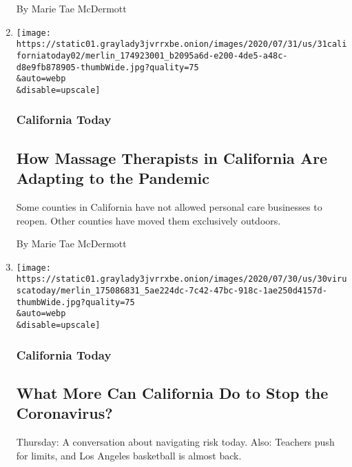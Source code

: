 \begin{enumerate}
  By Marie Tae McDermott
\item
  \href{/2020/07/31/us/essential-workers-massage-therapists.html}{}

  \texttt{[image: https://static01.graylady3jvrrxbe.onion/images/2020/07/31/us/31californiatoday02/merlin\_174923001\_b2095a6d-e200-4de5-a48c-d8e9fb878905-thumbWide.jpg?quality=75\\\&auto=webp\\\&disable=upscale]}

  \hypertarget{california-today-2}{%
  \subsubsection{California Today}\label{california-today-2}}

  \hypertarget{how-massage-therapists-in-california-are-adapting-to-the-pandemic}{%
  \subsection{How Massage Therapists in California Are Adapting to the
  Pandemic}\label{how-massage-therapists-in-california-are-adapting-to-the-pandemic}}

  Some counties in California have not allowed personal care businesses
  to reopen. Other counties have moved them exclusively outdoors.

  By Marie Tae McDermott
\item
  \href{/2020/07/30/us/coronavirus-california-health-equity.html}{}

  \texttt{[image: https://static01.graylady3jvrrxbe.onion/images/2020/07/30/us/30viruscatoday/merlin\_175086831\_5ae224dc-7c42-47bc-918c-1ae250d4157d-thumbWide.jpg?quality=75\\\&auto=webp\\\&disable=upscale]}

  \hypertarget{california-today-3}{%
  \subsubsection{California Today}\label{california-today-3}}

  \hypertarget{what-more-can-california-do-to-stop-the-coronavirus}{%
  \subsection{What More Can California Do to Stop the
  Coronavirus?}\label{what-more-can-california-do-to-stop-the-coronavirus}}

  Thursday: A conversation about navigating risk today. Also: Teachers
  push for limits, and Los Angeles basketball is almost back.


\end{enumerate}
